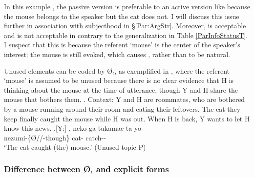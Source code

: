 In this example \Last[-Y5],
the passive version is preferable to an active version like \Last[-Y5]
because the mouse belongs to the speaker but the cat does not.
I will discuss this issue further in association with subjecthood in \S \ref{Par:ArgStr}.
Moreover,
 is acceptable and  is not acceptable in \Last[-Y5]
contrary to the generalization in Table \ref{ParInfoStatusT}.
I suspect that this is because the referent `mouse' is the center of the speaker's interest;
the mouse is still evoked,
which causes , rather than  to be natural.

Unused elements can be coded by {\O$_{t}$},
as exemplified in \Next,
where the referent `mouse' is assumed to be unused
because there is no clear evidence that H is thinking about the mouse at the time of utterance,
though Y and H share the mouse that bothers them.
%
\ex. \label{UnusedMouse}Context: Y and H are roommates,
	who are bothered by a mouse running around their room
	and eating their leftovers.
	The cat they keep finally caught the mouse while H was out.
	When H is back, Y wants to let H know this news.
	\ag.[Y:] , neko-ga tukamae-ta-yo \\
		nezumi-\{{\O}//-though\} cat- catch-- \\
		`The cat caught (the) mouse.' \hfill{(Unused topic P)}


\subsubsection{Difference between {\O$_{t}$} and explicit forms}

